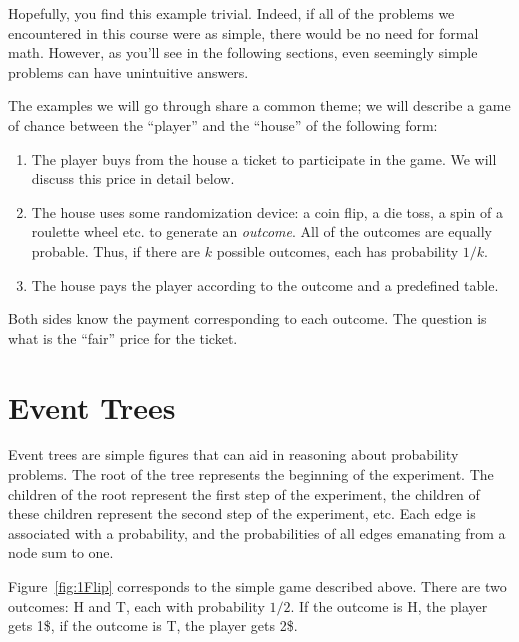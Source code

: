 Hopefully, you find this example trivial. Indeed, if all of the
problems we encountered in this course were as simple, there would be
no need for formal math. However, as you'll see in the following
sections, even seemingly simple problems can have unintuitive answers.

The examples we will go through share a common theme; we will describe
a game of chance between the ``player'' and the ``house'' of the following form:
\begin{enumerate}
\item The player buys from the house a ticket to participate in the
  game. We will discuss this price in detail below.
\item The house uses some randomization device: a coin flip, a die
  toss, a spin of a roulette wheel etc. to generate an {\em
    outcome}. All of the outcomes are equally probable. Thus, if there
  are $k$ possible outcomes, each has probability $1/k$.
\item The house pays the player according to the outcome and a
  predefined table.
\end{enumerate}

Both sides know the payment corresponding to each outcome. The
question is what is the ``fair'' price for the ticket.

\section{Event Trees}

Event trees are simple figures that can aid in reasoning about
probability problems. The root of the tree represents the beginning of
the experiment. The children of the root represent the first step of
the experiment, the children of these children represent the second
step of the experiment, etc.  Each edge is associated with a
probability, and the probabilities of all edges emanating from a node
sum to one.

Figure~\ref{fig:1Flip} corresponds to the simple game described
above. There are two outcomes: H and T, each with probability
$1/2$. If the outcome is H, the player gets 1\$, if the outcome is T,
the player gets 2\$.

